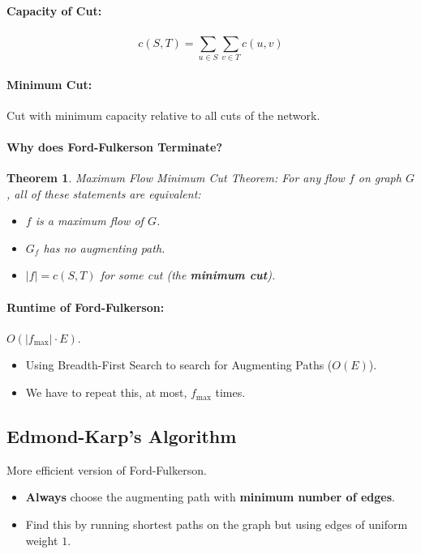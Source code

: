 \documentclass[a4paper,12pt]{report}
\newtheorem{theorem}{Theorem}
\begin{document}
\paragraph{Capacity of Cut: } 
\begin{equation}
c(S,T) = \sum_{u\in S}^{} \sum_{v\in T}^{} c(u,v)
\end{equation}

\paragraph{Minimum Cut: } Cut with minimum capacity relative to all cuts of the network. 

\paragraph{Why does Ford-Fulkerson Terminate? } 

\begin{theorem}{Maximum Flow Minimum Cut Theorem: }
For any flow $f$ on graph $G$, all of these statements are equivalent: 
\begin{itemize}
\item $f$ is a maximum flow of $G$.
\item $G_f$ has no augmenting path. 
\item $|f| = c(S,T)$ for some cut (the \textbf{minimum cut}).
\end{itemize}
\end{theorem}

\paragraph{Runtime of Ford-Fulkerson: } $O(|f_{\max}|\cdot E)$.
\begin{itemize}
\item Using Breadth-First Search to search for Augmenting Paths ($O(E)$).
\item We have to repeat this, at most, $f_{\max}$ times. 
\end{itemize}


\subsection{Edmond-Karp's Algorithm}

More efficient version of Ford-Fulkerson.
\begin{itemize}
\item \textbf{Always} choose the augmenting path with \textbf{minimum number of edges}.
\item Find this by running shortest paths on the graph but using edges of uniform weight $1$. 
\end{itemize}
\end{document}
